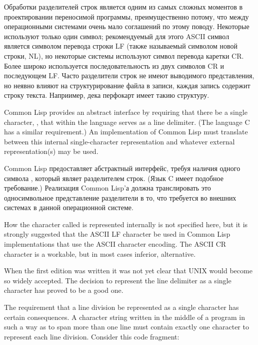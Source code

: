 Обработки разделителей строк является одним из самых сложных моментов в
проектировании переносимой программы, преимущественно потому, что между
операционными системами очень мало соглашений по этому поводу. Некоторые
используют только один символ; рекомендуемый для этого ASCII символ является
символом перевода строки LF (также называемый символом новой строки, NL),
но некоторые системы используют символ перевода каретки CR. Более
широко используется последовательность из двух символов CR и последующем
LF. Часто разделители строк не имеют выводимого представления, но неявно влияют
на структурирование файла в записи, каждая запись содержит строку
текста. Наприимер, дека перфокарт имеет такию структуру.

Common Lisp provides an abstract interface by requiring that there be a single
character, , that within the language serves as a line
delimiter.  (The language C has a similar requirement.)
An implementation of Common Lisp must translate between this internal
single-character representation and whatever external representation(s)
may be used.

Common Lisp предоставляет абстрактный интерфейс, требуя наличия одного символа
, который являет разделителем строк. (Язык C имеет
подобное требование.)
Реализация Common Lisp'а должна транслировать это односимвольное представление
разделители в то, что требуется во внешних системах в данной операционной системе.

\beforenoterule
\begin{implementation}
How the character called  is represented
internally is not specified here, but it is strongly suggested that
the ASCII LF character be used in Common Lisp implementations that use the
ASCII character encoding.  The ASCII CR character is a workable,
but in most cases inferior, alternative.
\end{implementation}
\afternoterule

\begin{newer}
When the first edition was written it was not yet clear that UNIX would
become so widely accepted.  The decision to represent
the line delimiter as a single character has proved to be a good one.
\end{newer}

The requirement that a line division be represented as a single character
has certain consequences.  A character string
written in the middle of a program in such a way as to span more than
one line must contain exactly one character to represent each line division.
Consider this code fragment:

